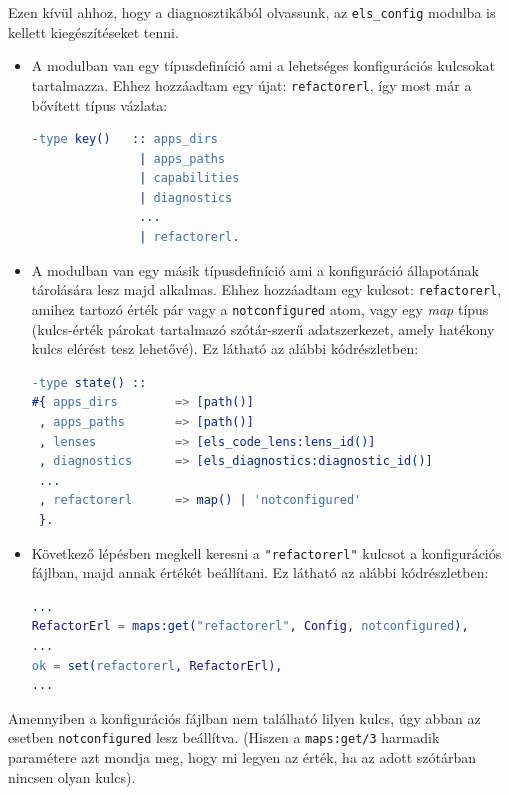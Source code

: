 Ezen kívül ahhoz, hogy a diagnosztikából olvassunk, az \lstinline{els_config} modulba is kellett kiegészítéseket tenni.

\begin{itemize}

    \item A modulban van egy típusdefiníció ami a lehetséges konfigurációs kulcsokat tartalmazza. Ehhez hozzáadtam egy újat: \lstinline{refactorerl}, így most már a bővített típus vázlata:
\begin{lstlisting}[language={erlang}]
-type key()   :: apps_dirs
               | apps_paths
               | capabilities
               | diagnostics
               ...
               | refactorerl.
 \end{lstlisting}
 
     \item A modulban van egy másik típusdefiníció ami a konfiguráció állapotának tárolására lesz majd alkalmas. Ehhez hozzáadtam egy kulcsot: \lstinline{refactorerl}, amihez tartozó érték pár vagy a \lstinline{notconfigured} atom, vagy egy \textit{map} típus (kulcs-érték párokat tartalmazó szótár-szerű adatszerkezet, amely hatékony kulcs elérést tesz lehetővé). Ez látható az alábbi kódrészletben:
\begin{lstlisting}[language={erlang}]
-type state() :: 
#{ apps_dirs        => [path()]
 , apps_paths       => [path()]
 , lenses           => [els_code_lens:lens_id()]
 , diagnostics      => [els_diagnostics:diagnostic_id()]
 ...
 , refactorerl      => map() | 'notconfigured'
 }.
 \end{lstlisting}
 
 \item Következő lépésben megkell keresni a \lstinline{"refactorerl"} kulcsot a konfigurációs fájlban, majd annak értékét beállítani. Ez látható az alábbi kódrészletben:
\begin{lstlisting}[language={erlang}]
...
RefactorErl = maps:get("refactorerl", Config, notconfigured),
...
ok = set(refactorerl, RefactorErl),
...
 \end{lstlisting}
    
\end{itemize}

Amennyiben a konfigurációs fájlban nem található lilyen kulcs, úgy abban az esetben  \lstinline{notconfigured} lesz beállítva. (Hiszen a \lstinline{maps:get/3} harmadik paramétere azt mondja meg, hogy mi legyen az érték, ha az adott szótárban nincsen olyan kulcs).

